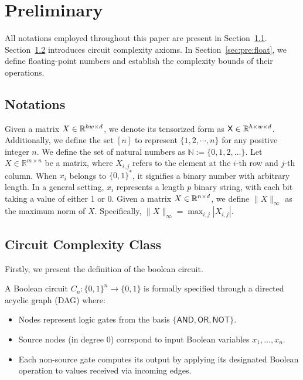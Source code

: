 \section{Preliminary}\label{sec:preliminary}
All notations employed throughout this paper are present in Section~\ref{sub:notations}. Section~\ref{sec:pre:circuit} introduces circuit complexity axioms. In Section~\ref{sec:pre:float}, we define floating-point numbers and establish the complexity bounds of their operations.
\subsection{Notations}\label{sub:notations}


Given a matrix $X \in \mathbb{R}^{hw \times d}$, we denote its tensorized form as $\mathsf{X} \in \mathbb{R}^{h \times w \times d}$. Additionally, we define the set $[n]$ to represent $\{1,2,\cdots, n\}$ for any positive integer $n$. We define the set of natural numbers as $\mathbb{N}:= \{0,1,2,\dots\}$. Let $X \in \mathbb{R}^{m \times n}$ be a matrix, where $X_{i,j}$ refers to the element at the $i$-th row and $j$-th column. When $x_i$ belongs to $\{ 0,1 \}^*$, it signifies a binary number with arbitrary length. In a general setting, $x_i$ represents a length $p$ binary string, with each bit taking a value of either 1 or 0. Given a matrix $X \in \mathbb{R}^{n \times d}$, we define $\|X\|_\infty  $ as the maximum norm of $X$. Specifically, $\|X\|_\infty = \max_{i,j} |X_{i,j}|$. 


\subsection{Circuit Complexity Class}\label{sec:pre:circuit}
Firstly, we present the definition of the boolean circuit.

\begin{definition} 
A Boolean circuit $C_n:\{0,1\}^n \to \{0, 1\}$ is formally specified through a directed acyclic graph (DAG) where:
\begin{itemize}
    \item Nodes represent logic gates from the basis $\{\mathsf{AND},\mathsf{OR},\mathsf{NOT}\}$.
    \item Source nodes (in degree $0$) corrspond to input Boolean variables ${x_1, \dots, x_n}$.
    \item Each non-source gate computes its output by applying its designated Boolean operation to values received via incoming edges.
\end{itemize}
\end{definition}




